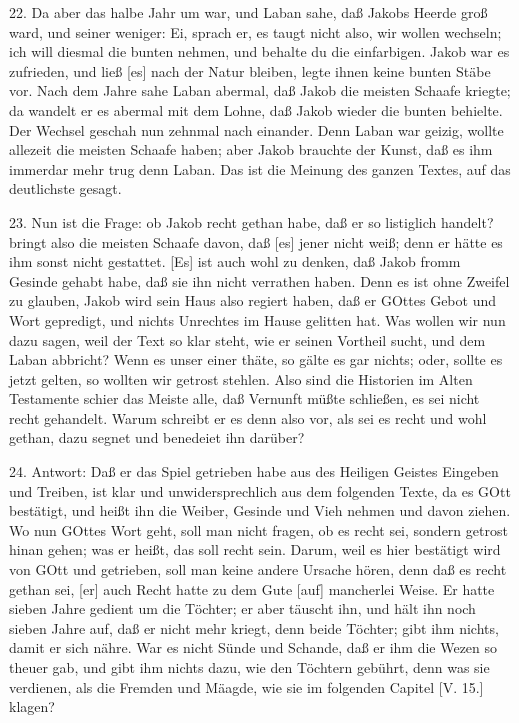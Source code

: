 22. Da aber das halbe Jahr um war, und Laban sahe, daß Jakobs Heerde groß ward, und seiner weniger: Ei, sprach er, es taugt nicht also, wir wollen wechseln; ich will diesmal die bunten nehmen, und behalte du die einfarbigen. Jakob war es zufrieden, und ließ [es] nach der Natur bleiben, legte ihnen keine bunten Stäbe vor. Nach dem Jahre sahe Laban abermal, daß Jakob die meisten Schaafe kriegte; da wandelt er es abermal mit dem Lohne, daß Jakob wieder die bunten behielte. Der Wechsel geschah nun zehnmal nach einander. Denn Laban war geizig, wollte allezeit die meisten Schaafe haben; aber Jakob brauchte der Kunst, daß es ihm immerdar mehr trug denn Laban. Das ist die Meinung des ganzen Textes, auf das deutlichste gesagt.

23. Nun ist die Frage: ob Jakob recht gethan habe, daß er so listiglich handelt? bringt also die meisten Schaafe davon, daß [es] jener nicht weiß; denn er hätte es ihm sonst nicht gestattet. [Es] ist auch wohl zu denken, daß Jakob fromm Gesinde gehabt habe, daß sie ihn nicht verrathen haben. Denn es ist ohne Zweifel zu glauben, Jakob wird sein Haus also regiert haben, daß er GOttes Gebot und Wort gepredigt, und nichts Unrechtes im Hause gelitten hat. Was wollen wir nun dazu sagen, weil der Text so klar steht, wie er seinen Vortheil sucht, und dem Laban
abbricht? Wenn es unser einer thäte, so gälte es gar nichts; oder, sollte es jetzt gelten, so wollten wir getrost stehlen. Also sind die Historien im Alten Testamente schier das Meiste alle, daß Vernunft müßte schließen, es sei nicht recht gehandelt. Warum schreibt er es denn also vor, als sei es recht und wohl gethan, dazu segnet und benedeiet ihn darüber?

24. Antwort: Daß er das Spiel getrieben habe aus des Heiligen Geistes Eingeben und Treiben, ist klar und unwidersprechlich aus dem folgenden Texte, da es GOtt bestätigt, und heißt ihn die Weiber, Gesinde und Vieh nehmen und davon ziehen. Wo nun GOttes Wort geht, soll man nicht fragen, ob es recht sei, sondern getrost hinan gehen; was er heißt, das soll recht sein. Darum, weil es hier bestätigt wird von GOtt und getrieben, soll man keine andere Ursache hören, denn daß es recht gethan sei, [er] auch Recht hatte zu dem Gute [auf] mancherlei Weise. Er hatte sieben Jahre gedient um die Töchter; er aber täuscht ihn, und hält ihn noch sieben Jahre auf, daß er nicht mehr kriegt, denn beide Töchter; gibt ihm nichts, damit er sich nähre. War es nicht Sünde und Schande, daß er ihm die Wezen so theuer gab, und gibt ihm nichts dazu, wie den Töchtern gebührt, denn was sie verdienen, als die Fremden und Mäagde, wie sie im folgenden Capitel [V. 15.] klagen?

